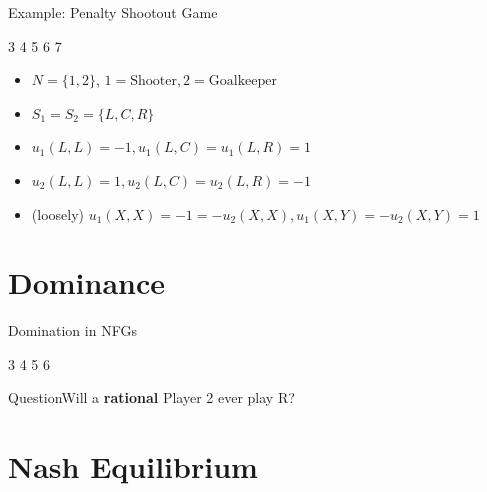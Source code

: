 \documentclass[10pt,aspectratio=169]{beamer}
\newcommand{\question}[1]{\begin{alertblock}{Question}{#1}\end{alertblock} }
\begin{document}
\begin{frame}{Example: Penalty Shootout Game}
\begin{center}
\begin{matrixgame}[player names={Shooter, Goalkeeper}, w=2, h=1]
3 
4 
5 
6 \bottomlabel{}
7 \end{matrixgame}
\pause
\begin{itemize}
    \item $N=\{1,2\}$, $1=\text{Shooter}, 2=\text{Goalkeeper}$
    \item $S_1=S_2=\{L,C,R\}$
    \item $u_1(L,L) = -1, u_1(L,C) = u_1(L,R) = 1$
    \item $u_2(L,L) = 1, u_2(L,C) = u_2(L,R)=-1$
    \item (loosely) $u_1(X,X) = -1 = -u_2(X,X), u_1(X,Y) = -u_2(X,Y) = 1$
\end{itemize}
\end{center}
\end{frame}


\section{Dominance}

\begin{frame}{Domination in NFGs}
    \begin{center}
    \begin{matrixgame}[player names={Player 1, Player 2}, w=2, h=1]
    3 
    4 
    5 
    6 \end{matrixgame}
    \end{center}
    \pause
    \question{Will a {\bf rational} Player 2 ever play R?}
\end{frame}



\section{Nash Equilibrium}
\end{document}
